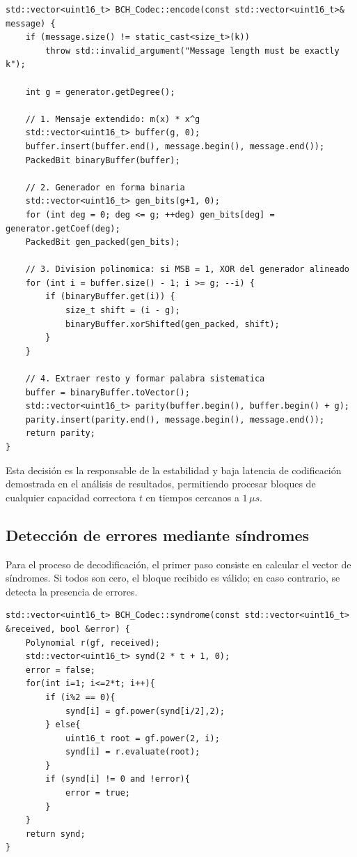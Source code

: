 \begin{lstlisting}[style=CodigoCPP, caption={Proceso de codificación sistemática en \texttt{BCH\_Codec}, calculando los bits de paridad mediante división polinómica.}, label={lst:bch_encode}]
std::vector<uint16_t> BCH_Codec::encode(const std::vector<uint16_t>& message) {
    if (message.size() != static_cast<size_t>(k))
        throw std::invalid_argument("Message length must be exactly k");

    int g = generator.getDegree();

    // 1. Mensaje extendido: m(x) * x^g
    std::vector<uint16_t> buffer(g, 0);
    buffer.insert(buffer.end(), message.begin(), message.end());
    PackedBit binaryBuffer(buffer);

    // 2. Generador en forma binaria
    std::vector<uint16_t> gen_bits(g+1, 0);
    for (int deg = 0; deg <= g; ++deg) gen_bits[deg] = generator.getCoef(deg);
    PackedBit gen_packed(gen_bits);

    // 3. Division polinomica: si MSB = 1, XOR del generador alineado
    for (int i = buffer.size() - 1; i >= g; --i) {
        if (binaryBuffer.get(i)) {
            size_t shift = (i - g);
            binaryBuffer.xorShifted(gen_packed, shift);
        }
    }

    // 4. Extraer resto y formar palabra sistematica
    buffer = binaryBuffer.toVector();
    std::vector<uint16_t> parity(buffer.begin(), buffer.begin() + g);
    parity.insert(parity.end(), message.begin(), message.end());
    return parity;
}
\end{lstlisting}

Esta decisión es la responsable de la estabilidad y baja latencia de codificación demostrada en el análisis de resultados, permitiendo procesar bloques de cualquier capacidad correctora $t$ en tiempos cercanos a $1\,\mu s$.

\subsection{Detección de errores mediante síndromes}

Para el proceso de decodificación, el primer paso consiste en calcular el vector de síndromes. Si todos son cero, el bloque recibido es válido; en caso contrario, se detecta la presencia de errores.

\begin{lstlisting}[style=CodigoCPP, caption={Evaluación de la palabra código recibida en las raíces del generador para computar el vector de síndromes e identificar la presencia de errores.}, label={lst:bch_syndrome}]
std::vector<uint16_t> BCH_Codec::syndrome(const std::vector<uint16_t> &received, bool &error) {
    Polynomial r(gf, received);
    std::vector<uint16_t> synd(2 * t + 1, 0);
    error = false;
    for(int i=1; i<=2*t; i++){
        if (i%2 == 0){
            synd[i] = gf.power(synd[i/2],2);
        } else{
            uint16_t root = gf.power(2, i);
            synd[i] = r.evaluate(root);
        }
        if (synd[i] != 0 and !error){
            error = true;
        }
    }
    return synd;
}
\end{lstlisting}

